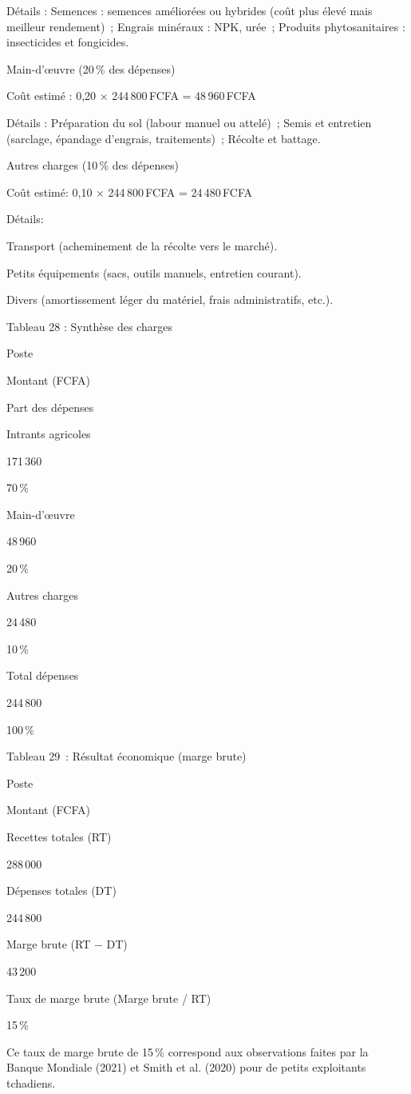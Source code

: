 \documentclass[12pt,oneside]{report}
\begin{document}
Détails : Semences : semences améliorées ou hybrides (coût plus élevé mais meilleur rendement) ; Engrais minéraux : NPK, urée ; Produits phytosanitaires : insecticides et fongicides.

Main-d’œuvre (20 \% des dépenses)

Coût estimé : 0,20 × 244 800 FCFA = 48 960 FCFA

Détails : Préparation du sol (labour manuel ou attelé) ; Semis et entretien (sarclage, épandage d’engrais, traitements) ; Récolte et battage.

Autres charges (10 \% des dépenses)

Coût estimé: 0,10 × 244 800 FCFA = 24 480 FCFA

Détails:

Transport (acheminement de la récolte vers le marché).

Petits équipements (sacs, outils manuels, entretien courant).

Divers (amortissement léger du matériel, frais administratifs, etc.).

Tableau 28 : Synthèse des charges

Poste

Montant (FCFA)

Part des dépenses

Intrants agricoles

171 360

70 \%

Main-d’œuvre

48 960

20 \%

Autres charges

24 480

10 \%

Total dépenses

244 800

100 \%

Tableau 29 : Résultat économique (marge brute)

Poste

Montant (FCFA)

Recettes totales (RT)

288 000

Dépenses totales (DT)

244 800

Marge brute (RT − DT)

43 200

Taux de marge brute (Marge brute / RT)

15 \%

Ce taux de marge brute de 15 \% correspond aux observations faites par la Banque Mondiale (2021) et Smith et al. (2020) pour de petits exploitants tchadiens.
\end{document}
